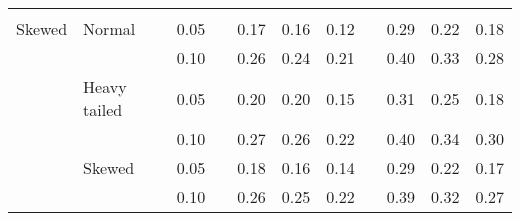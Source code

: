 \begin{table}[ht]
\begin{scriptsize}
\begin{tabular}{ll p{.1cm} c p{.1cm} rrr p{.1cm} rrr}
             &&&&&&&&&&&\\
Skewed       & Normal       && 0.05 &&  0.17 & 0.16 & 0.12 && 0.29 & 0.22 & 0.18 \\ 
             &              && 0.10 &&  0.26 & 0.24 & 0.21 && 0.40 & 0.33 & 0.28 \\ 
             & Heavy tailed && 0.05 &&  0.20 & 0.20 & 0.15 && 0.31 & 0.25 & 0.18 \\ 
             &              && 0.10 &&  0.27 & 0.26 & 0.22 && 0.40 & 0.34 & 0.30 \\ 
             & Skewed       && 0.05 &&  0.18 & 0.16 & 0.14 && 0.29 & 0.22 & 0.17 \\ 
             &              && 0.10 &&  0.26 & 0.25 & 0.22 && 0.39 & 0.32 & 0.27 \\ 

\hline
\end{tabular}
\end{scriptsize}
\end{table}

